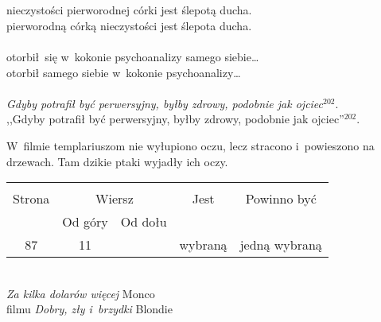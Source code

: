\documentclass[a4paper,11pt]{article}
\begin{document}
\noi \\
 \\
\Jest nieczystości pierworodnej córki jest ślepotą ducha. \\
\Pow pierworodną córką nieczystości jest ślepota ducha. \\
 \\
\Jest otorbił~się w~kokonie psychoanalizy samego siebie\ldots \\
\Pow otorbił samego siebie w~kokonie psychoanalizy\ldots \\
 \\
\Jest \emph{Gdyby potrafił być perwersyjny, byłby zdrowy, podobnie jak
  ojciec$^{ 202 }$}. \\
\Pow ,,Gdyby potrafił być perwersyjny, byłby zdrowy,
podobnie jak ojciec''$^{ 202 }$. \\

\vspace{\spaceTwo}








\start {} W~filmie templariuszom nie wyłupiono oczu, lecz
stracono i~powieszono na drzewach. Tam dzikie ptaki wyjadły ich oczy.

\begin{center}
  \begin{tabular}{|c|c|c|c|c|}
    \hline
    & \multicolumn{2}{c|}{} & & \\
    Strona & \multicolumn{2}{c|}{Wiersz} & Jest
                              & Powinno być \\ \cline{2-3}
    & Od góry & Od dołu & & \\
    \hline
    87 & 11 & & wybraną & jedną wybraną \\
    \hline
  \end{tabular}
\end{center}
\noi
{} \\
\Jest \emph{Za kilka dolarów więcej} Monco \\
\Pow filmu \emph{Dobry, zły i~brzydki} Blondie \\
\end{document}
